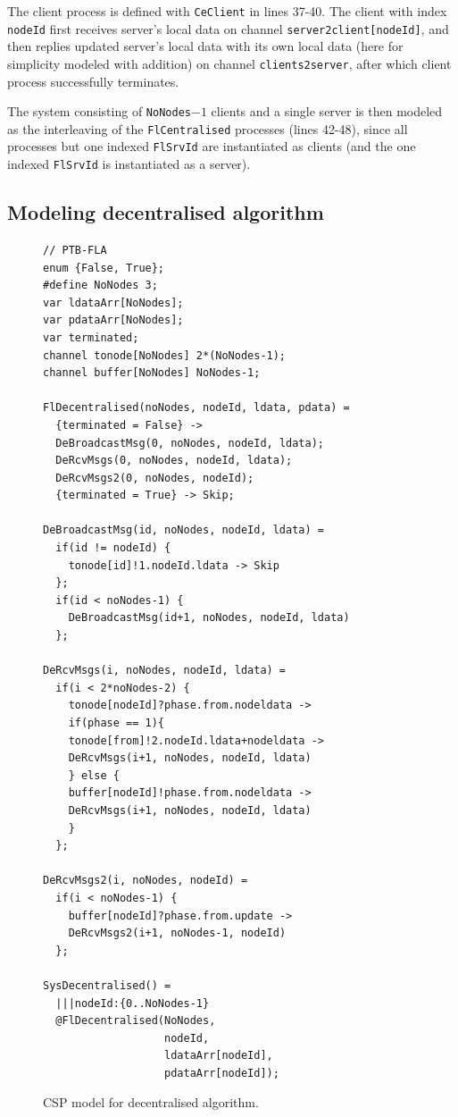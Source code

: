 \documentclass[runningheads]{llncs}
\begin{document}
The client process is defined with \lstinline{CeClient} in lines 37-40. 
The client with index \lstinline{nodeId} first receives server's local data on channel \lstinline{server2client[nodeId]}, and then replies updated server's local data with its own local data (here for simplicity modeled with addition) on channel \lstinline{clients2server}, after which client process successfully terminates.

The system consisting of \lstinline{NoNodes}$-1$  clients and a single server is then modeled as the interleaving of the \lstinline{FlCentralised} processes (lines 42-48), since all processes but one indexed  \lstinline{FlSrvId} are instantiated as clients (and the one indexed \lstinline{FlSrvId} is instantiated as a server).






\subsection{Modeling decentralised algorithm}\label{sec:modeling_decentralized_algorithm}

\begin{figure}
\begin{lstlisting}[frame=single]
// PTB-FLA
enum {False, True};
#define NoNodes 3;
var ldataArr[NoNodes];
var pdataArr[NoNodes];
var terminated;
channel tonode[NoNodes] 2*(NoNodes-1);  
channel buffer[NoNodes] NoNodes-1; 

FlDecentralised(noNodes, nodeId, ldata, pdata) =
  {terminated = False} ->
  DeBroadcastMsg(0, noNodes, nodeId, ldata);
  DeRcvMsgs(0, noNodes, nodeId, ldata);
  DeRcvMsgs2(0, noNodes, nodeId);
  {terminated = True} -> Skip;

DeBroadcastMsg(id, noNodes, nodeId, ldata) =
  if(id != nodeId) {
    tonode[id]!1.nodeId.ldata -> Skip
  };
  if(id < noNodes-1) {
    DeBroadcastMsg(id+1, noNodes, nodeId, ldata)
  };

DeRcvMsgs(i, noNodes, nodeId, ldata) =
  if(i < 2*noNodes-2) {
    tonode[nodeId]?phase.from.nodeldata -> 
    if(phase == 1){
    tonode[from]!2.nodeId.ldata+nodeldata -> 
    DeRcvMsgs(i+1, noNodes, nodeId, ldata)
    } else {
    buffer[nodeId]!phase.from.nodeldata ->
    DeRcvMsgs(i+1, noNodes, nodeId, ldata)
    }
  };

DeRcvMsgs2(i, noNodes, nodeId) =
  if(i < noNodes-1) {
    buffer[nodeId]?phase.from.update -> 
    DeRcvMsgs2(i+1, noNodes-1, nodeId)
  };

SysDecentralised() = 
  |||nodeId:{0..NoNodes-1}
  @FlDecentralised(NoNodes, 
                   nodeId, 
                   ldataArr[nodeId], 
                   pdataArr[nodeId]);
\end{lstlisting}
\caption{CSP model for decentralised algorithm.}
\label{fig:CSP_decentralized}
\end{figure}
\end{document}
